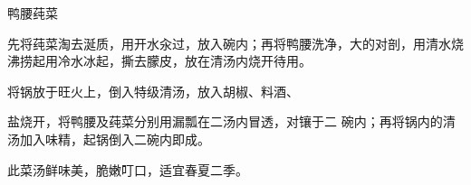 \begin{recipe}{鸭腰莼菜}

\ingredients


\cooking

\step 先将莼菜淘去涎质，用开水汆过，放入碗内；再将鸭腰洗净，大的对剖，用清水烧沸捞起用冷水冰起，撕去朦皮，放在清汤内烧开待用。

\step 将锅放于旺火上，倒入特级清汤，放入胡椒、料酒、

盐烧开，将鸭腰及莼菜分别用漏瓢在二汤内冒透，对镶于二 碗内；再将锅内的清汤加入味精，起锅倒入二碗内即成。

\notes

此菜汤鲜味美，脆嫩叮口，适宜春夏二季。

\end{recipe}


